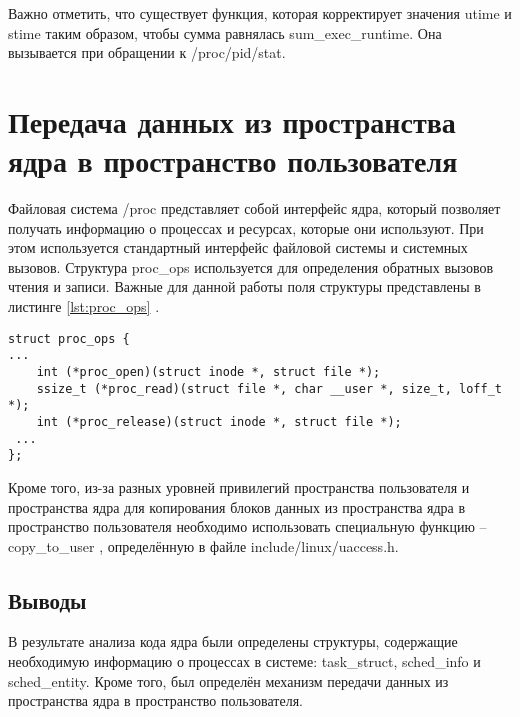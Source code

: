 Важно отметить, что существует функция, которая корректирует значения utime и stime таким образом, чтобы сумма равнялась sum\_exec\_runtime. Она вызывается при обращении к /proc/pid/stat.



\section{Передача данных из пространства ядра в пространство пользователя}
Файловая система /proc представляет собой интерфейс ядра, который позволяет получать информацию о процессах и ресурсах, которые они используют. При этом используется стандартный интерфейс файловой системы и системных вызовов. Структура proc\_ops используется для определения обратных вызовов чтения и записи. Важные для данной работы поля структуры представлены в листинге \ref{lst:proc_ops} \cite{bib:3}.

\begin{lstlisting}[label=lst:proc_ops,caption=Структура proc\_ops.]
struct proc_ops {
...
	int	(*proc_open)(struct inode *, struct file *);
	ssize_t	(*proc_read)(struct file *, char __user *, size_t, loff_t *);
	int	(*proc_release)(struct inode *, struct file *);
 ...
};
\end{lstlisting}


Кроме того, из-за разных уровней привилегий пространства пользователя и пространства ядра для копирования блоков данных из пространства ядра в пространство пользователя необходимо использовать специальную функцию -- copy\_to\_user \cite{bib:3}, определённую в файле include/linux/uaccess.h.

\subsection*{Выводы}
В результате анализа кода ядра были определены структуры, содержащие необходимую информацию  о процессах в системе: task\_struct, sched\_info и sched\_entity. Кроме того, был определён механизм передачи данных из пространства ядра в пространство пользователя.

